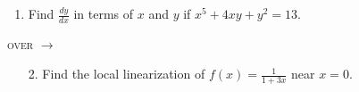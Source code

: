 \documentclass[11pt]{article}
\begin{document}
\pagestyle{empty}
\newsavebox{\quizfront}
\begin{lrbox}{\quizfront}
\begin{minipage}[top][4.5in][t]{\textwidth} \setlength{\parindent}{1.5em}
\drawtitle
\vspace{-0.5in}
\begin{enumerate}

\item Find $\frac{dy}{dx}$ in terms of $x$ and $y$ if $x^5+4xy+y^2 = 13$.

  \vfill

\end{enumerate}

\hfill \textsc{over} $\longrightarrow$

\end{minipage}
\end{lrbox}

\newsavebox{\quizback}
\begin{lrbox}{\quizback}
\begin{minipage}[top][4.5in][t]{\textwidth} \setlength{\parindent}{1.5em}
\begin{enumerate}
\item[2.] Find the local linearization of $\displaystyle f(x) =
  \frac{1}{1+3x}$ near $x = 0$.

\end{enumerate}
\end{minipage}
\end{lrbox}

\noindent \usebox{\quizfront}
\vfill
\noindent \usebox{\quizfront}

\pagebreak
\noindent \usebox{\quizback}
\vfill
\noindent \usebox{\quizback}
\end{document}
